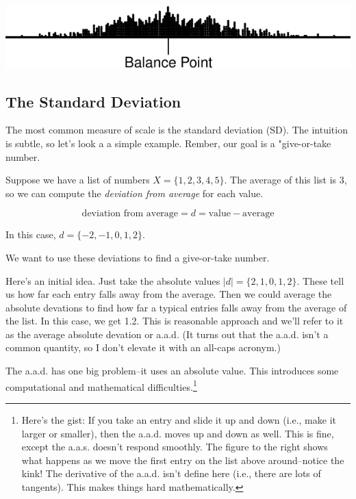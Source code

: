 \documentclass[]{book}
\let\rmarkdownfootnote\footnote%
\def\footnote{\protect\rmarkdownfootnote}
\begin{document}
\includegraphics{concepts-and-computation_files/figure-latex/unnamed-chunk-4-1.pdf}

\hypertarget{the-standard-deviation}{%
\subsection{The Standard Deviation}\label{the-standard-deviation}}

The most common measure of scale is the standard deviation (SD). The intuition is subtle, so let's look a a simple example. Rember, our goal is a "give-or-take number.

Suppose we have a list of numbers \(X = \{1, 2, 3, 4, 5\}\). The average of this list is 3, so we can compute the \emph{deviation from average} for each value.

\begin{equation}
\text{deviation from average} = d = \text{value} - \text{average} \nonumber
\end{equation}

In this case, \(d = \{-2, -1, 0, 1, 2\}\).

We want to use these deviations to find a give-or-take number.

Here's an initial idea. Just take the absolute values \(|d| = \{2, 1, 0, 1, 2\}\). These tell us how far each entry falls away from the average. Then we could average the absolute devations to find how far a typical entries falls away from the average of the list. In this case, we get 1.2. This is reasonable approach and we'll refer to it as the average absolute devation or a.a.d. (It turns out that the a.a.d. isn't a common quantity, so I don't elevate it with an all-caps acronym.)

The a.a.d. has one big problem--it uses an absolute value. This introduces some computational and mathematical difficulties.\footnote{Here's the gist: If you take an entry and slide it up and down (i.e., make it larger or smaller), then the a.a.d. moves up and down as well. This is fine, except the a.a.s. doesn't respond smoothly. The figure to the right shows what happens as we move the first entry on the list above around--notice the kink! The derivative of the a.a.d. isn't define here (i.e., there are lots of tangents). This makes things hard mathematically.}
\end{document}
